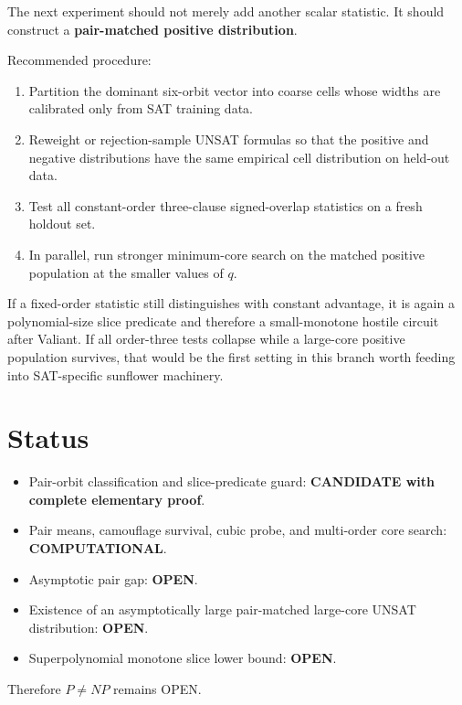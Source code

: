 \documentclass[11pt]{article}
\begin{document}
The next experiment should not merely add another scalar statistic.  It should
construct a \textbf{pair-matched positive distribution}.

Recommended procedure:

\begin{enumerate}
\item Partition the dominant six-orbit vector into coarse cells whose widths
are calibrated only from SAT training data.
\item Reweight or rejection-sample UNSAT formulas so that the positive and
negative distributions have the same empirical cell distribution on held-out
data.
\item Test all constant-order three-clause signed-overlap statistics on a
fresh holdout set.
\item In parallel, run stronger minimum-core search on the matched positive
population at the smaller values of $q$.
\end{enumerate}

If a fixed-order statistic still distinguishes with constant advantage, it is
again a polynomial-size slice predicate and therefore a small-monotone hostile
circuit after Valiant.  If all order-three tests collapse while a large-core
positive population survives, that would be the first setting in this branch
worth feeding into SAT-specific sunflower machinery.

\section{Status}

\begin{itemize}
\item[] Pair-orbit classification and slice-predicate guard:
\textbf{CANDIDATE with complete elementary proof}.
\item[] Pair means, camouflage survival, cubic probe, and multi-order core
search: \textbf{COMPUTATIONAL}.
\item[] Asymptotic pair gap: \textbf{OPEN}.
\item[] Existence of an asymptotically large pair-matched large-core UNSAT
distribution: \textbf{OPEN}.
\item[] Superpolynomial monotone slice lower bound: \textbf{OPEN}.
\end{itemize}

Therefore $P\ne NP$ remains OPEN.
\end{document}

